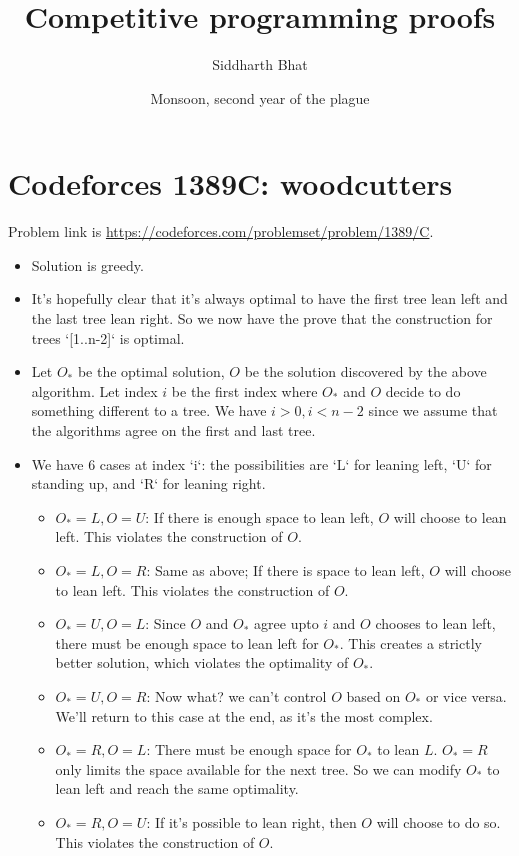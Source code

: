 \documentclass[14pt]{report}
\title{Competitive programming proofs}
\author{Siddharth Bhat}
\date{Monsoon, second year of the plague}
\begin{document}
\maketitle
\tableofcontents
\section{Codeforces 1389C: woodcutters}
Problem link is \url{https://codeforces.com/problemset/problem/1389/C}.
\begin{itemize}
\item Solution is greedy.
\item It's hopefully clear that it's always optimal to have the
    first tree lean left and the last tree lean right.  So we now
    have the prove that the construction for trees `[1..n-2]` is
    optimal.

\item Let $O_*$ be the optimal solution, $O$ be the solution discovered by the
    above algorithm.  Let index $i$ be the first index where $O_*$ and $O$
        decide to do something different to a tree.  We have $i > 0, i < n-2$
        since we assume that the algorithms agree on the first and last tree.
\item We have  6 cases at index `i`: the possibilities are `L` for leaning left, `U` for standing up, and `R` for leaning right.
\begin{itemize}
\item  $O_*=L, O=U$: If there is enough space to lean left, $O$ will choose to
    lean left. This violates the construction of $O$.
\item  $O_*=L, O=R$: Same as above; If there is space to lean left, $O$ will
    choose to lean left. This violates the construction of $O$.
\item  $O_*=U, O=L$: Since $O$ and $O_*$ agree upto $i$ and $O$ chooses to lean
    left, there must be enough space to lean left for $O_*$. This creates a
        strictly better solution,  which violates the optimality of $O_*$.
\item $O_*=U, O=R$: Now what? we can't control $O$ based on $O_*$ or vice
    versa.  We'll return to this case at the end, as it's the most complex.
\item $O_*=R, O=L$: There must be enough space for $O_*$ to lean $L$. $O_*=R$
    only limits the space available for the next tree. So we can modify $O_*$
        to lean left and reach the same optimality.
\item $O_*=R, O=U$: If it's possible to lean right, then $O$ will choose to do
    so. This violates the construction of $O$.
\end{itemize}


\end{itemize}
\end{document}
